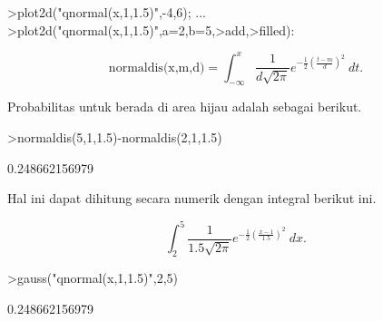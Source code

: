 \documentclass[a4paper,10pt]{article}
\begin{document}
\begin{eulernotebook}
\begin{eulercomment}
\begin{eulercomment}
\begin{eulercomment}
\begin{eulercomment}
\begin{eulercomment}
\begin{eulercomment}
\begin{eulercomment}
\begin{eulercomment}
\begin{eulercomment}
\begin{eulercomment}
\begin{eulercomment}
\begin{eulercomment}
\begin{eulercomment}
\begin{eulercomment}
\begin{eulercomment}
\begin{eulercomment}
\begin{eulercomment}
\begin{eulercomment}
\begin{eulercomment}
\begin{eulercomment}
\begin{eulercomment}
\begin{eulercomment}
\begin{eulercomment}
\begin{eulercomment}
\begin{eulercomment}
\begin{eulercomment}
\begin{eulercomment}
\begin{eulercomment}
\begin{eulercomment}
\begin{eulercomment}
\begin{eulercomment}
\begin{eulercomment}
\begin{eulercomment}
\begin{eulercomment}
\begin{eulercomment}
\begin{eulercomment}
\begin{eulercomment}
\begin{eulercomment}
\begin{eulercomment}
\begin{eulercomment}
\begin{eulercomment}
\begin{eulercomment}
\begin{eulercomment}
\begin{eulercomment}
\begin{eulerprompt}
>plot2d("qnormal(x,1,1.5)",-4,6);  ...
>plot2d("qnormal(x,1,1.5)",a=2,b=5,>add,>filled):
\end{eulerprompt}
\begin{eulerformula}
\[
\text{normaldis(x,m,d)}=\int_{-\infty}^x \frac{1}{d\sqrt{2\pi}}e^{-\frac{1}{2}(\frac{t-m}{d})^2}\ dt.
\]
\end{eulerformula}
\begin{eulercomment}
Probabilitas untuk berada di area hijau adalah sebagai berikut.
\end{eulercomment}
\begin{eulerprompt}
>normaldis(5,1,1.5)-normaldis(2,1,1.5)
\end{eulerprompt}
\begin{euleroutput}
  0.248662156979
\end{euleroutput}
\begin{eulercomment}
Hal ini dapat dihitung secara numerik dengan integral berikut ini.\\
\end{eulercomment}
\begin{eulerformula}
\[
\int_2^5 \frac{1}{1.5\sqrt{2\pi}}e^{-\frac{1}{2}(\frac{x-1}{1.5})^2}\ dx.
\]
\end{eulerformula}
\begin{eulerprompt}
>gauss("qnormal(x,1,1.5)",2,5)
\end{eulerprompt}
\begin{euleroutput}
  0.248662156979

\end{euleroutput}
\end{eulercomment}
\end{eulercomment}
\end{eulercomment}
\end{eulercomment}
\end{eulercomment}
\end{eulercomment}
\end{eulercomment}
\end{eulercomment}
\end{eulercomment}
\end{eulercomment}
\end{eulercomment}
\end{eulercomment}
\end{eulercomment}
\end{eulercomment}
\end{eulercomment}
\end{eulercomment}
\end{eulercomment}
\end{eulercomment}
\end{eulercomment}
\end{eulercomment}
\end{eulercomment}
\end{eulercomment}
\end{eulercomment}
\end{eulercomment}
\end{eulercomment}
\end{eulercomment}
\end{eulercomment}
\end{eulercomment}
\end{eulercomment}
\end{eulercomment}
\end{eulercomment}
\end{eulercomment}
\end{eulercomment}
\end{eulercomment}
\end{eulercomment}
\end{eulercomment}
\end{eulercomment}
\end{eulercomment}
\end{eulercomment}
\end{eulercomment}
\end{eulercomment}
\end{eulercomment}
\end{eulercomment}
\end{eulercomment}
\end{eulernotebook}
\end{document}
